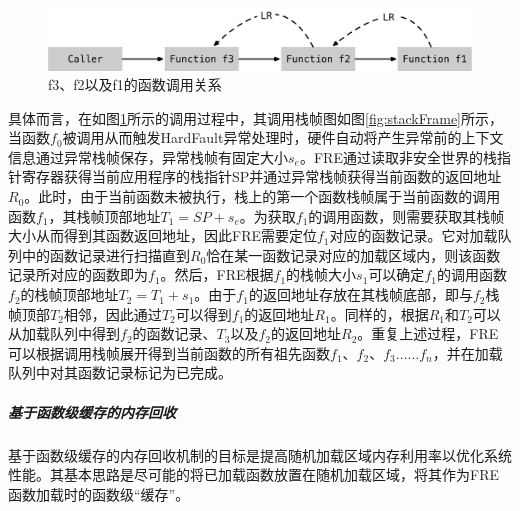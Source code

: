 \documentclass[12pt,a4paper]{ctexart}
\numberwithin{figure}{section}
\begin{document}
\begin{figure}[h]
    \centering
    \includegraphics[scale=0.5]{graph/funcCall.png}
    \caption{f3、f2以及f1的函数调用关系}
    \label{fig:funcCall}
\end{figure}
\par 具体而言，在如图\ref{fig:funcCall}所示的调用过程中，其调用栈帧图如图\ref{fig:stackFrame}所示，当函数$f_0$被调用从而触发HardFault异常处理时，硬件自动将产生异常前的上下文信息通过异常栈帧保存，异常栈帧有固定大小$s_e$。FRE通过读取非安全世界的栈指针寄存器获得当前应用程序的栈指针SP并通过异常栈帧获得当前函数的返回地址$R_0$。此时，由于当前函数未被执行，栈上的第一个函数栈帧属于当前函数的调用函数$f_1$，其栈帧顶部地址$T_1=SP+s_e$。为获取$f_1$的调用函数，则需要获取其栈帧大小从而得到其函数返回地址，因此FRE需要定位$f_1$对应的函数记录。它对加载队列中的函数记录进行扫描直到$R_0$恰在某一函数记录对应的加载区域内，则该函数记录所对应的函数即为$f_1$。然后，FRE根据$f_1$的栈帧大小$s_1$可以确定$f_1$的调用函数$f_2$的栈帧顶部地址$T_2=T_1+s_1$。由于$f_1$的返回地址存放在其栈帧底部，即与$f_2$栈帧顶部$T_2$相邻，因此通过$T_2$可以得到$f_1$的返回地址$R_1$。同样的，根据$R_1$和$T_2$可以从加载队列中得到$f_2$的函数记录、$T_3$以及$f_2$的返回地址$R_2$。重复上述过程，FRE可以根据调用栈帧展开得到当前函数的所有祖先函数$f_1、f_2、f_3……f_n$，并在加载队列中对其函数记录标记为已完成。
\subparagraph{基于函数级缓存的内存回收}
\par 基于函数级缓存的内存回收机制的目标是提高随机加载区域内存利用率以优化系统性能。其基本思路是尽可能的将已加载函数放置在随机加载区域，将其作为FRE函数加载时的函数级“缓存”。
\end{document}
